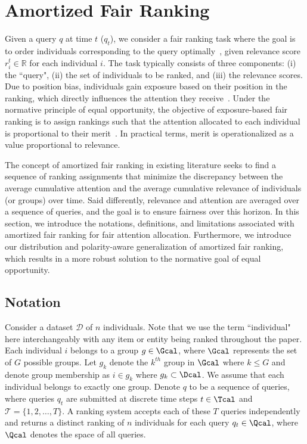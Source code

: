 \section{Amortized Fair Ranking}
\label{ref:section_ranking_def}
Given a query $q$ at time $t$ ($q_t$), we consider a fair ranking task where the goal is to order individuals corresponding to the query optimally~\cite{robertson1977probability}, given relevance score $r_i^t \in \mathbb{R}$ for each individual $i$. The task typically consists of three components: (i) the ``query", (ii) the set of individuals to be ranked, and (iii) the relevance scores. Due to position bias, individuals gain exposure based on their position in the ranking, which directly influences the attention they receive~\cite{biega2018equity,singh2018fairness}. Under the normative principle of equal opportunity, the objective of exposure-based fair ranking is to assign rankings such that the attention allocated to each individual is proportional to their merit~\cite{singh2019policy,zehlike2021fairness,zehlike2022fairness,balagopalan2023role}. In practical terms, merit is operationalized as a value proportional to relevance.

The concept of amortized fair ranking in existing literature seeks to find a sequence of ranking assignments that minimize the discrepancy between the average cumulative attention and the average cumulative relevance of individuals (or groups) over time. Said differently, relevance and attention are averaged over a sequence of queries, and the goal is to ensure fairness over this horizon. In this section, we introduce the notations, definitions, and limitations associated with amortized fair ranking for fair attention allocation. Furthermore, we introduce our distribution and polarity-aware generalization of amortized fair ranking, which results in a more robust solution to the normative goal of equal opportunity.








\subsection{Notation}
Consider a dataset $\mathcal{D}$ of $n$ individuals. Note that we use the term ``individual" here interchangeably with any item or entity being ranked throughout the paper. Each individual $i$ belongs to a group $g \in \Gcal$, where $\Gcal$ represents the set of $G$ possible groups. Let $g_k$ denote the $k^{th}$ group in $\Gcal$ where $k \le G$ and denote group membership as $i \in g_k$ where $g_k \subset \Dcal$. We assume that each individual belongs to exactly one group. Denote $q$ to be a sequence of queries, where queries $q_t$ are submitted at discrete time steps $t \in \Tcal$ and $\mathcal{T} = \{1, 2, \ldots, T\}$. A ranking system accepts each of these $T$ queries independently and returns a distinct ranking of $n$ individuals for each query $q_t \in \Qcal$, where $\Qcal$ denotes the space of all queries.

